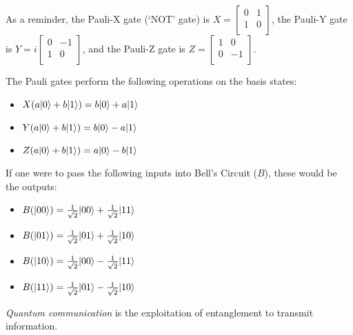 
As a reminder, the Pauli-X gate (`NOT' gate) is $X = \begin{bmatrix}
    0 & 1 \\
    1 & 0\\
\end{bmatrix}$, the Pauli-Y gate is $Y = i \begin{bmatrix}
    0 & -1 \\
    1 & 0\\
\end{bmatrix}$, and the Pauli-Z gate is $Z = \begin{bmatrix}
    1 & 0 \\
    0 & -1\\
\end{bmatrix}$.

The Pauli gates perform the following operations on the basis states:\\
\begin{itemize}
    \item $X(a \lvert0\rangle + b \lvert1\rangle) = b \lvert0\rangle + a \lvert1\rangle$
    \item $Y(a \lvert0\rangle + b \lvert1\rangle) = b \lvert0\rangle - a \lvert1\rangle$
    \item $Z(a \lvert0\rangle + b \lvert1\rangle) = a \lvert0\rangle - b \lvert1\rangle$
\end{itemize}

If one were to pass the following inputs into Bell's Circuit ($B$), these would be the outputs:
\begin{itemize}
    \item $B(\lvert00\rangle) = \frac{1}{\sqrt{2}} \lvert00\rangle + \frac{1}{\sqrt{2}} \lvert11\rangle$
    \item $B(\lvert01\rangle) = \frac{1}{\sqrt{2}} \lvert01\rangle + \frac{1}{\sqrt{2}} \lvert10\rangle$
    \item $B(\lvert10\rangle) = \frac{1}{\sqrt{2}} \lvert00\rangle - \frac{1}{\sqrt{2}} \lvert11\rangle$
    \item $B(\lvert11\rangle) = \frac{1}{\sqrt{2}} \lvert01\rangle - \frac{1}{\sqrt{2}} \lvert10\rangle$
\end{itemize}

\begin{definition}
    \emph{Quantum communication} is the exploitation of entanglement to transmit information.
\end{definition}

